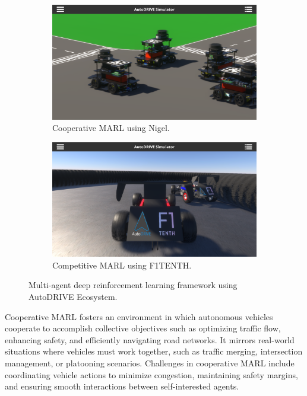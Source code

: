 \documentclass[letterpaper, 10 pt, conference]{ieeeconf}  %
\begin{document}
	\begin{figure}[t]
		\centering
		\begin{subfigure}[b]{\linewidth}
			\centering
			\includegraphics[width=\linewidth]{Fig1a.png}
			\caption{Cooperative MARL using Nigel.}
			\label{fig1a}
		\end{subfigure}
		\hfill
		\begin{subfigure}[b]{\linewidth}
			\centering
			\includegraphics[width=\linewidth]{Fig1b.png}
			\caption{Competitive MARL using F1TENTH.}
			\label{fig1b}
		\end{subfigure}
		\caption{Multi-agent deep reinforcement learning framework using AutoDRIVE Ecosystem.}
		\label{fig1}
	\end{figure}
	
	Cooperative MARL \cite{semnani2020multiagent, long2018optimally, aradi2020survey, wang2020mrcdrl, zhou2019learn, 9316033} fosters an environment in which autonomous vehicles cooperate to accomplish collective objectives such as optimizing traffic flow, enhancing safety, and efficiently navigating road networks. It mirrors real-world situations where vehicles must work together, such as traffic merging, intersection management, or platooning scenarios. Challenges in cooperative MARL include coordinating vehicle actions to minimize congestion, maintaining safety margins, and ensuring smooth interactions between self-interested agents.
	
\end{document}
